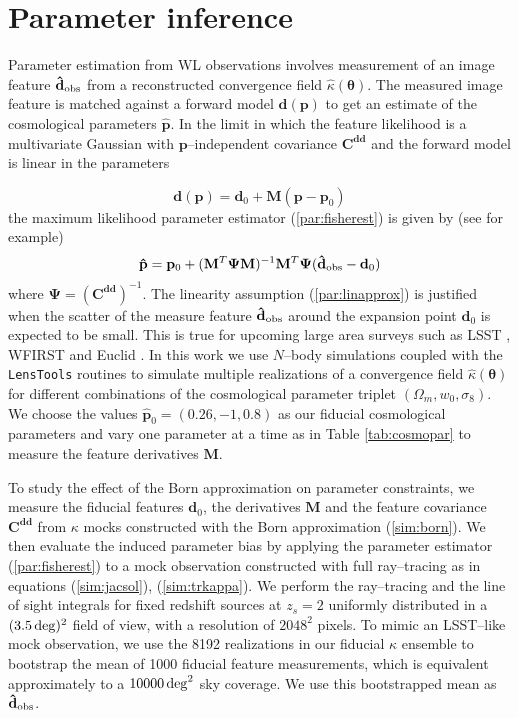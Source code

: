 \documentclass[reprint,aps,prd,superscriptaddress,showkeys,showpacs]{revtex4-1}
\newcommand{\bb}[1]{\mathbf{#1}}
\newcommand{\bbh}[1]{\mathbf{\hat{#1}}}
\newcommand{\h}[1]{\hat{#1}}
\newcommand{\ttt}[1]{\texttt{#1}}
\newcommand\pt{\pmb{\theta}}
\begin{document}
\section{Parameter inference}
% 
Parameter estimation from WL observations involves measurement of an image feature $\bbh{d}_{\rm obs}$ from a reconstructed convergence field $\h{\kappa}(\pt)$. The measured image feature is matched against a forward model $\bb{d}(\bb{p})$ to get an estimate of the cosmological parameters $\bbh{p}$. In the limit in which the feature likelihood is a multivariate Gaussian with $\bb{p}$--independent covariance $\bb{C}^{\bb{d}\bb{d}}$ and the forward model is linear in the parameters 

\begin{equation}
\label{par:linapprox}
\bb{d}(\bb{p}) = \bb{d}_0 + \bb{M}(\bb{p}-\bb{p}_0)
\end{equation}
%
the maximum likelihood parameter estimator (\ref{par:fisherest}) is given by (see \citep{DodelsonSchneider13,PetriVariance} for example)
\begin{equation}
\label{par:fisherest}
\bbh{p} = \bb{p}_0 + (\bb{M}^T\bb{\Psi M})^{-1} \bb{M}^T\bb{\Psi} (\bbh{d}_{\rm obs}-\bb{d}_0)
\end{equation}
%
where $\bb{\Psi}=(\bb{C}^{\bb{d}\bb{d}})^{-1}$. The linearity assumption (\ref{par:linapprox}) is justified when the scatter of the measure feature $\bbh{d}_{\rm obs}$ around the expansion point $\bb{d}_0$ is expected to be small. This is true for upcoming large area surveys such as LSST \citep{LSST}, WFIRST \citep{WFIRST} and Euclid \citep{Euclid}. In this work we use $N$--body simulations coupled with the \ttt{LensTools} routines to simulate multiple realizations of a convergence field $\h{\kappa}(\pt)$ for different combinations of the cosmological parameter triplet $(\Omega_m,w_0,\sigma_8)$. We choose the values $\bbh{p}_0=(0.26,-1,0.8)$ as our fiducial cosmological parameters and vary one parameter at a time as in Table \ref{tab:cosmopar} to measure the feature derivatives $\bb{M}$. 

To study the effect of the Born approximation on parameter constraints, we measure the fiducial features $\bb{d}_0$, the derivatives $\bb{M}$ and the feature covariance $\bb{C}^{\bb{d}\bb{d}}$ from $\kappa$ mocks constructed with the Born approximation (\ref{sim:born}). We then evaluate the induced parameter bias by applying the parameter estimator (\ref{par:fisherest}) to a mock observation constructed with full ray--tracing as in equations (\ref{sim:jacsol}), (\ref{sim:trkappa}). We perform the ray--tracing and the line of sight integrals for fixed redshift sources at $z_s=2$ uniformly distributed in a $(3.5\,{\rm deg})^2$ field of view, with a resolution of $2048^2$ pixels. To mimic an LSST--like mock observation, we use the 8192 realizations in our fiducial $\kappa$ ensemble to bootstrap the mean of 1000 fiducial feature measurements, which is equivalent approximately to a $10000\,{\rm deg}^2$ sky coverage. We use this bootstrapped mean as $\bbh{d}_{\rm obs}$.   
\end{document}
